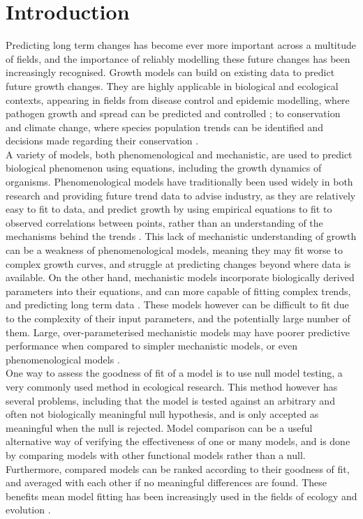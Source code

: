 \documentclass[11pt, letterpaper]{article}
\begin{document}
\section{Introduction} %
Predicting long term changes has become ever more important across a multitude of fields, and the importance of reliably modelling these future changes has been increasingly recognised. Growth models can build on existing data to predict future growth changes. They are highly applicable in biological and ecological contexts, appearing in fields from disease control and epidemic modelling, where pathogen growth and spread can be predicted and controlled \citep{covid}; to conservation and climate change, where species population trends can be identified and decisions made regarding their conservation \citep{orangutan}. \\

\noindent A variety of models, both phenomenological and mechanistic, are used to predict biological phenomenon using equations, including the growth dynamics of organisms. Phenomenological models have traditionally been used widely in both research and providing future trend data to advise industry, as they are relatively easy to fit to data, and predict growth by using empirical equations to fit to observed correlations between points, rather than an understanding of the mechanisms behind the trends \citep{transtrum_bridging_2016}. This lack of mechanistic understanding of growth can be a weakness of phenomenological models, meaning they may fit worse to complex growth curves, and struggle at predicting changes beyond where data is available. On the other hand, mechanistic models incorporate biologically derived parameters into their equations, and can more capable of fitting complex trends, and predicting long term data \citep{transtrum_bridging_2016}. These models however can be difficult to fit due to the complexity of their input parameters, and the potentially large number of them. Large, over-parameterised mechanistic models may have poorer predictive performance when compared to simpler mechanistic models, or even phenomenological models \citep{levins_strategy_2023, pitt_when_2002, transtrum_bridging_2016}.\\

\noindent One way to assess the goodness of fit of a model is to use null model testing, a very commonly used method in ecological research. This method however has several problems, including that the model is tested against an arbitrary and often not biologically meaningful null hypothesis, and is only accepted as meaningful when the null is rejected. Model comparison can be a useful alternative way of verifying the effectiveness of one or many models, and is done by comparing models with other functional models rather than a null. Furthermore, compared models can be ranked according to their goodness of fit, and averaged with each other if no meaningful differences are found. These benefits mean model fitting has been increasingly used in the fields of ecology and evolution \citep{johnson_model_2004}. \\
\end{document}
